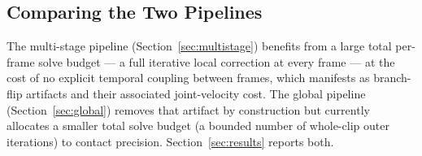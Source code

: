 \subsection{Comparing the Two Pipelines}
\label{sec:comparing}

The multi-stage pipeline (Section~\ref{sec:multistage}) benefits from a
large total per-frame solve budget --- a full iterative local correction at
every frame --- at the cost of no explicit temporal coupling between
frames, which manifests as branch-flip artifacts and their associated
joint-velocity cost. The global pipeline (Section~\ref{sec:global}) removes
that artifact by construction but currently allocates a smaller total solve
budget (a bounded number of whole-clip outer iterations) to contact
precision. Section~\ref{sec:results} reports both.
